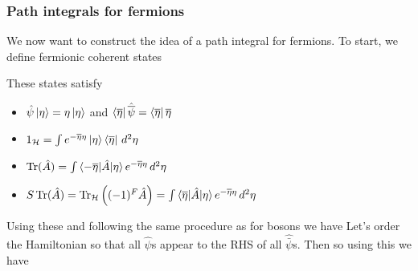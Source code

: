 \documentclass{article}
\begin{document}
\subsubsection*{Path integrals for fermions}
We now want to construct the idea of a path integral for fermions. To start, we define fermionic coherent states
\begin{prop}
	These states satisfy 
	\begin{itemize}
		\item $\hat{\psi}\ket{\eta} = \eta\ket{\eta}$ and $\bra{\overline{\eta}}\hat{\overline{\psi}} = \bra{\overline{\eta}} \overline{\eta}$
		\item $1_{\mathcal{H}} = \int e^{-\overline{\eta}\eta} \ket{\eta}\bra{\overline{\eta}} \, d^2\eta$ 
		\item $\operatorname{Tr}(\hat{A}) = \int \braket{-\overline{\eta}|\hat{A}|\eta} e^{-\overline{\eta}\eta} \, d^2 \eta$
		\item $S\operatorname{Tr}(\hat{A}) = \operatorname{Tr}_{\mathcal{H}} \left( (-1)^F \hat{A} \right) = \int \braket{\overline{\eta}|\hat{A}|\eta} e^{-\overline{\eta}\eta} \, d^2 \eta$
	\end{itemize}
\end{prop}
Using these and following the same procedure as for bosons we have 
Let's order the Hamiltonian so that all $\hat{\psi}$s appear to the RHS of all $\hat{\bar{\psi}}$s. Then 
so 
using this we have 
\end{document}
